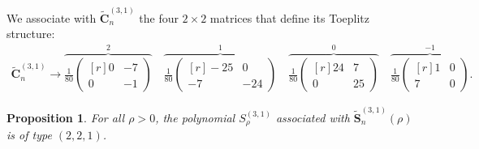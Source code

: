 \documentclass[addpoints,12pt,letter]{article}
\newcommand{\SR}{S}
\numberwithin{equation}{section}
\newtheorem{proposition}[lemma]{Proposition}
\theoremstyle{definition}
\begin{document}
We associate with $\widetilde{\mathbf{C}}_{n}^{(3,1)}$ the four $2\times 2$ matrices that define its Toeplitz structure:
\begin{align*}
\widetilde{\mathbf{C}}_{n}^{(3,1)}\to
\overbrace{\frac{1}{80}\begin{pmatrix}[r]
0 &-7 \\
0 &-1
\end{pmatrix}}^{2}
\quad
\overbrace{\frac{1}{80}\begin{pmatrix}[r]
-25 & 0 \\
-7 &-24
\end{pmatrix}}^{1}
\quad
\overbrace{\frac{1}{80}\begin{pmatrix}[r]
24 & 7 \\
0 & 25
\end{pmatrix}}^{0}
\quad
\overbrace{\frac{1}{80}\begin{pmatrix}[r]
1 & 0 \\
7 & 0
\end{pmatrix}}^{-1}.
\end{align*}

\begin{proposition} \label{prop:515}
For all $\rho>0$, the polynomial $\SR_{\rho}^{(3,1)}$ associated with $\widetilde{\mathbf{S}}_{n}^{(3,1)}(\rho)$ is of type $(2,2,1)$.
\end{proposition}
\end{document}
